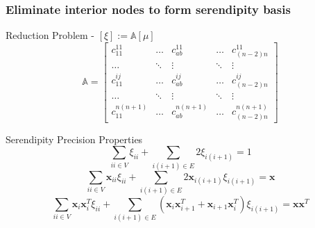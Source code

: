 \documentclass[compress,10pt]{beamer}
\renewcommand{\vec}[1]{\mathbf{#1}}
\begin{document}
\begin{frame}[t]\frametitle{Eliminate interior nodes to form serendipity basis}
\begin{block}{Reduction Problem - $\left[ \xi \right] := \mathbb{A}  \left[ \mu \right]$}{\small
\begin{equation*}
\mathbb{A} = 
\left[
\begin{array}{ccccc}
c_{11}^{11} & \ldots & c_{ab}^{11} & \ldots & c_{(n-2)n}^{11} \\
\ldots&\ddots&\vdots&\ddots&\vdots \\
c_{11}^{ij} & \ldots & c_{ab}^{ij} & \ldots & c_{(n-2)n}^{ij} \\
\ldots&\ddots&\vdots&\ddots&\vdots \\
c_{11}^{n(n+1)} & \ldots & c_{ab}^{n(n+1)} & \ldots & c_{(n-2)n}^{n(n+1)} 
\end{array}
\right]
\end{equation*}
}\end{block}
\begin{block}{Serendipity Precision Properties}{\small
\begin{equation*}
\sum_{ii \in V} \xi_{ii} + \sum_{i(i+1) \in E} 2 \xi_{i(i+1)} = 1
\end{equation*}
\begin{equation*}
\sum_{ii \in V} \vec{x}_{ii} \xi_{ii} + \sum_{i(i+1) \in E} 2 \vec{x}_{i(i+1)} \xi_{i(i+1)} = \vec{x}
\end{equation*}
\begin{equation*}
\sum_{ii \in V} \vec{x}_{i} \vec{x}_{i}^T \xi_{ii} + \sum_{i(i+1) \in E} \left(  \vec{x}_{i} \vec{x}_{i+1}^T + \vec{x}_{i+1} \vec{x}_{i}^T  \right) \xi_{i(i+1)} = \vec{x} \vec{x}^{T}
\end{equation*}
}\end{block}
\end{frame}
\end{document}
